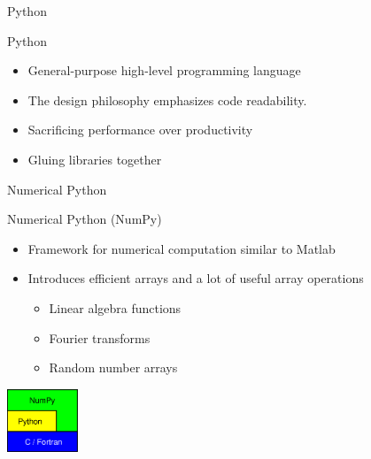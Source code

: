 \documentclass{beamer}
\begin{document}

\begin{frame}{Python}
\begin{center}
\begin{Large}
Python
\end{Large}
\end{center}
\begin{itemize}
\item General-purpose high-level programming language
\item The design philosophy emphasizes code readability.
\item Sacrificing performance over productivity
\item Gluing libraries together
\end{itemize}
\end{frame}


\begin{frame}[fragile]{Numerical Python}
\begin{center}
\begin{Large}
Numerical Python (NumPy)
\end{Large}
\end{center}
\begin{itemize}
  \item Framework for numerical computation similar to Matlab
  \item Introduces efficient arrays and a lot of useful array operations
\begin{itemize}
  \item Linear algebra functions
  \item Fourier transforms
  \item Random number arrays  
\end{itemize}
\end{itemize}
\begin{center}
\includegraphics[width=80px]{SoftwareLayout}
\end{center}
\end{frame}

\end{document}
